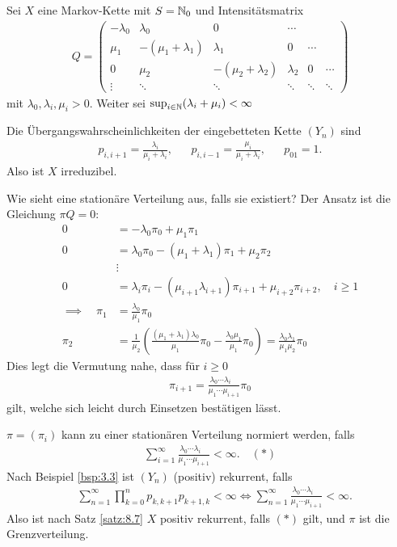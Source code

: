 \documentclass[a4paper,twoside,DIV15,BCOR12mm]{scrbook}
\begin{document}
\begin{beispiel}
Sei $X$ eine Markov-Kette mit $S=\mathbb{N}_0$ und Intensitätsmatrix 
\begin{align*}
Q=
\begin{pmatrix}
-\lambda_0 & \lambda_0 & 0 & \cdots \\
\mu_1  & -(\mu_1 + \lambda_1) & \lambda _1 & 0 & \cdots  \\
0 & \mu_2 & -(\mu_2 + \lambda_2) & \lambda_2 & 0 & \cdots \\
\vdots &\ddots & \ddots & \ddots & \ddots & \ddots
\end{pmatrix}
\end{align*}
mit $\lambda_0,\lambda_i,\mu_i>0$. Weiter sei $\sup_{i\in \mathbb{N}}(\lambda_i+\mu_i) <\infty$

Die Übergangswahrscheinlichkeiten der eingebetteten Kette $(Y_n)$ sind
\begin{align*}
p_{i,i+1} = \frac{\lambda_i}{\mu_i+\lambda_i}, && p_{i,i-1} = \frac{\mu_i}{\mu_i+\lambda_i}, && p_{01} = 1.
\end{align*}
Also ist $X$ irreduzibel.

Wie sieht eine stationäre Verteilung aus, falls sie existiert?
Der Ansatz ist die Gleichung $\pi Q=0$:
\begin{align*}
0 &= -\lambda_0\pi_0 + \mu_1\pi_1 \\
0 &= \lambda_0\pi_0 - (\mu_1 + \lambda_1)\pi_1 + \mu_2\pi_2 \\
&\vdots \\
0 &= \lambda_i\pi_i - (\mu_{i+1} \lambda_{i+1})\pi_{i+1} + \mu_{i+2}\pi_{i+2},\quad i\ge 1 \\
\implies \quad \pi_1 &= \frac{\lambda_0}{\mu_1} \pi_0 \\
\pi_2  &= \frac{1}{\mu_2}(\frac{(\mu_1+\lambda_1)\lambda_0}{\mu_1}\pi_0 - \frac{\lambda_0\mu_1}{\mu_1}\pi_0) = \frac{\lambda_0\lambda_1}{\mu_1\mu_2}\pi_0
\end{align*}
Dies legt die Vermutung nahe, dass für $i\ge 0$
\begin{align*}
\pi_{i+1} = \frac{\lambda_0\cdots\lambda_{i\phantom{+1}}}{\mu_1\cdots\mu_{i+1}}\pi_0
\end{align*}
gilt, welche sich leicht durch Einsetzen bestätigen lässt.

$\pi=(\pi_i)$ kann zu einer stationären Verteilung normiert werden, falls 
\begin{align*}
\sum_{i=1}^\infty \frac{\lambda_0\cdots\lambda_{i\phantom{+1}}}{\mu_1\cdots\mu_{i+1}}<\infty. \quad (*)
\end{align*}
Nach Beispiel \ref{bsp:3.3} ist $(Y_n)$ (positiv) rekurrent, falls
\begin{align*}
&\sum_{n=1}^\infty \prod_{k=0}^n p_{k,k+1}p_{k+1,k} < \infty 
\iff  \sum_{n=1}^\infty  \frac{\lambda_0\cdots\lambda_{i\phantom{+1}}}{\mu_1\cdots\mu_{i+1}}<\infty.
\end{align*}
Also ist nach Satz \ref{satz:8.7} $X$ positiv rekurrent, falls $(*)$ gilt, und $\pi$ ist die Grenzverteilung.


\end{beispiel}
\end{document}
